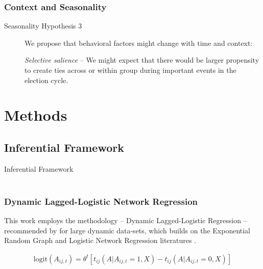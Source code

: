 \documentclass{beamer}
\begin{document}
\begin{frame}
\frametitle{Context and Seasonality}

\begin{block}{}
\begin{description}

\item[Seasonality Hypothesis 3] We propose that behavioral factors might change with time and context: 

\emph{Selective salience} --  We might expect that there would be larger propensity to create ties across or within group during important events in the election cycle.

\end{description}

\end{block}

\end{frame}

\section{Methods}

\subsection{Inferential Framework}

\begin{frame}

\begin{block}{
\center
Inferential Framework\\

\

}
\end{block}
\end{frame}


\begin{frame}
\frametitle{Dynamic Lagged-Logistic Network Regression}

\begin{block}{}
This work employs the methodology -- Dynamic Lagged-Logistic Regression -- recommended by \cite{almquist10} for large dynamic data-sets, which builds on the Exponential Random Graph \citep{holland81a, holland81b, butts08, snijders06,strauss} and Logistic Network Regression literatures \citep{krackhardt87a,krackhardt87b,krackhardt88}.
\end{block}

\begin{block}{}
 \begin{align}
\textrm{logit}(A_{ij,t}) = \theta^t\left[t_{ij}(A|A_{ij,t}=1,X)-t_{ij}(A|A_{ij,t}=0,X)\right]
\end{align}
\end{block}

\end{frame}
\end{document}
